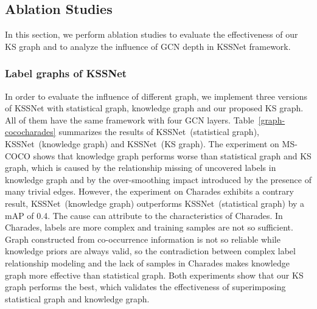 \documentclass[letterpaper]{article} \usepackage{aaai20}  \usepackage{times}  \usepackage{helvet} \usepackage{courier}  \usepackage[hyphens]{url}  \usepackage{graphicx} \usepackage{subfigure}
\begin{document}
\begin{table*}[t]
\centering
\caption{Performance of different GCN depths of KSSNet. On each experiment, all versions of KSSNet use KSS graph as adjacency matrix.}
\label{layers}
\end{table*}
\subsection{Ablation Studies}
In this section, we perform ablation studies to evaluate the effectiveness of our KS graph and to analyze the influence of GCN depth in KSSNet framework. 


\subsubsection{Label graphs of KSSNet}
In order to evaluate the influence of different graph, we implement three versions of KSSNet with statistical graph, knowledge graph and our proposed KS graph. All of them have the same framework with four GCN layers. 
Table~\ref{graph-cococharades} summarizes the results of KSSNet~(statistical graph), KSSNet~(knowledge graph) and KSSNet~(KS graph). The experiment on MS-COCO shows that knowledge graph performs worse than statistical graph and KS graph, which is caused by the relationship missing of uncovered labels in knowledge graph and by the over-smoothing impact introduced by the presence of many trivial edges. However, the experiment on Charades exhibits a contrary result, KSSNet~(knowledge graph) outperforms KSSNet~(statistical graph) by a mAP of 0.4. The cause can attribute to the characteristics of Charades. In Charades, labels are more complex and training samples are not so sufficient. Graph constructed from co-occurrence information is not so reliable while knowledge priors are always valid, so the contradiction between complex label relationship modeling and the lack of samples in Charades makes knowledge graph more effective than statistical graph. 
Both experiments show that our KS graph performs the best, which validates the effectiveness of superimposing statistical graph and knowledge graph.
\end{document}
